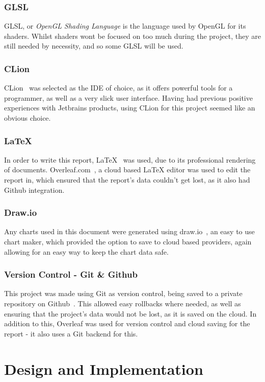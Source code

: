 \documentclass[a4paper,10pt]{report}
\begin{document}
\subsection{GLSL}

GLSL, or \textit{OpenGL Shading Language} is the language used by OpenGL for its shaders. Whilst shaders wont be focused on too much during the project, they are still needed by necessity, and so some GLSL will be used.

\subsection{CLion}
CLion~\cite{clion_jetbrains} was selected as the IDE of choice, as it offers powerful tools for a programmer, as well as a very slick user interface. Having had previous positive experiences with Jetbrains products, using CLion for this project seemed like an obvious choice.

\subsection{LaTeX}
In order to write this report, LaTeX~\cite{latex_website} was used, due to its professional rendering of documents. Overleaf.com~\cite{overleaf_website}, a cloud based LaTeX editor was used to edit the report in, which ensured that the report's data couldn't get lost, as it also had Github integration.

\subsection{Draw.io}
Any charts used in this document were generated using draw.io~\cite{draw_io}, an easy to use chart maker, which provided the option to save to cloud based providers, again allowing for an easy way to keep the chart data safe. 

\subsection{Version Control - Git \& Github}
This project was made using Git as version control, being saved to a private repository on Github~\cite{github}. This allowed easy rollbacks where needed, as well as ensuring that the project's data would not be lost, as it is saved on the cloud. In addition to this, Overleaf was used for version control and cloud saving for the report - it also uses a Git backend for this.


\chapter{Design and Implementation}
\end{document}
